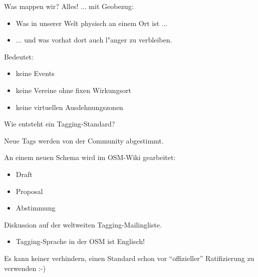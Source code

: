 \documentclass{beamer}
\begin{document}
\begin{frame}{Was mappen wir?}
         Alles! ... \pause mit Geobezug:
  \begin{itemize}
           \item  Was in unserer Welt physisch an einem Ort ist ... \pause
             \item ... und was vorhat dort auch l"anger zu verbleiben.
  \end{itemize}
  
  Bedeutet:
  \begin{itemize}
    \item keine Events
    \item keine Vereine ohne fixen Wirkungsort
    \item keine virtuellen Ausdehnungszonen
  \end{itemize}   

\end{frame}




\begin{frame}{Wie entsteht ein Tagging-Standard?}

Neue Tags werden von der Community abgestimmt.
\vspace{0.7cm}

An einem neuen Schema wird im OSM-Wiki gearbeitet:
\begin{itemize}
  \item Draft
  \item Proposal
  \item Abstimmung
\end{itemize}

Diskussion auf der weltweiten Tagging-Mailingliste.
\pause
\begin{itemize}
	  \item Tagging-Sprache in der OSM ist Englisch!
\end{itemize}

\pause
Es kann keiner verhindern, einen Standard schon vor ``offizieller'' Ratifizierung zu verwenden :-)

\end{frame}
\end{document}
